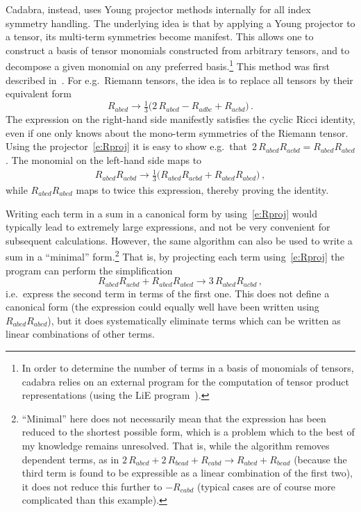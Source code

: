 \documentclass{elsart}
\begin{document}
Cadabra, instead, uses Young projector methods internally for all
index symmetry handling. The underlying idea is that by applying a
Young projector to a tensor, its multi-term symmetries become
manifest. This allows one to construct a basis of tensor monomials
constructed from arbitrary tensors, and to decompose a given monomial
on any preferred basis.\footnote{In order to determine the number of
terms in a basis of monomials of tensors, cadabra relies on an
external program for the computation of tensor product representations
(using the LiE program~\cite{e_cohe1}).} This method was first
described in~\cite{Green:2005qr}. For e.g.~Riemann tensors, the idea
is to replace all tensors by their equivalent form
\begin{equation}
\label{e:Rproj}
R_{a b c d} \rightarrow 
 \tfrac{1}{3}\big( 2\, R_{a b c d} - R_{a d b c} + R_{a c b d} \big)\,.
\end{equation}
The expression on the right-hand side manifestly satisfies the cyclic
Ricci identity, even if one only knows about the mono-term symmetries
of the Riemann tensor. Using the projector~\eqref{e:Rproj} it is easy
to show e.g.~that~$2\,R_{a b c d} R_{a c b d} = R_{a b c d} R_{a b c
d}$. The monomial on the left-hand side maps to
\begin{equation}
\begin{aligned}
R_{a b c d} R_{a c b d} \rightarrow \tfrac{1}{3} \big( R_{a b c d} R_{a c b d}
 + R_{a b c d} R_{a b c d} \big)\,,
\end{aligned}
\end{equation}
while $R_{a b c d} R_{a b c d}$ maps to twice this expression, thereby
proving the identity.

Writing each term in a sum in a canonical form by
using~\eqref{e:Rproj} would typically lead to extremely large
expressions, and not be very convenient for subsequent
calculations. However, the same algorithm can also be used to write a
sum in a ``minimal'' form.\footnote{``Minimal'' here does not
necessarily mean that the expression has been reduced to the shortest
possible form, which is a problem which to the best of my knowledge
remains unresolved. That is, while the algorithm removes dependent
terms, as in $2\,R_{a b c d} + 2\,R_{b c a d} + R_{c a b d} \rightarrow
R_{a b c d} + R_{b c a d}$ (because the third term is found to be
expressible as a linear combination of the first two), it does not
reduce this further to $- R_{c a b d}$ (typical cases are of course
more complicated than this example).} That is, by projecting each
term using~\eqref{e:Rproj} the program can perform the simplification
\begin{equation}
R_{a b c d} R_{a c b d} + R_{a b c d} R_{a b c d}
 \rightarrow 3\,R_{a b c d} R_{a c b d}\,,
\end{equation}
i.e.~express the second term in terms of the first one.  This does not
define a canonical form (the expression could equally well have been
written using~$R_{a b c d} R_{a b c d}$), but it does systematically
eliminate terms which can be written as linear combinations of other
terms.
\end{document}
